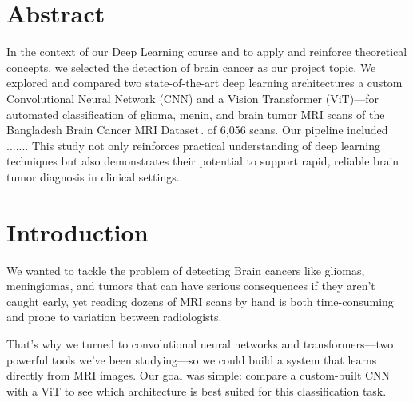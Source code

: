\documentclass[twocolumn,superscriptaddress,aps]{revtex4-1}
\begin{document}







\section{Abstract}
In the context of our Deep Learning course and to apply and reinforce theoretical concepts, we selected the detection of brain cancer as our project topic. We explored and compared two state-of-the-art deep learning architectures a custom Convolutional Neural Network (CNN) and a Vision Transformer (ViT)—for automated classification of glioma, menin, and brain tumor MRI scans of the Bangladesh Brain Cancer MRI Dataset\,\cite{dataset}. of 6,056 scans. Our pipeline included .......
This study not only reinforces practical understanding of deep learning techniques but also demonstrates their potential to support rapid, reliable brain tumor diagnosis in clinical settings.



\section{Introduction}

We wanted to tackle the problem of detecting Brain cancers like gliomas, meningiomas, and tumors that can have serious consequences if they aren’t caught early, yet reading dozens of MRI scans by hand is both time-consuming and prone to variation between radiologists.

That’s why we turned to convolutional neural networks and transformers—two powerful tools we’ve been studying—so we could build a system that learns directly from MRI images. Our goal was simple: compare a custom-built CNN with a ViT to see which architecture is best suited for this classification task.
\end{document}
